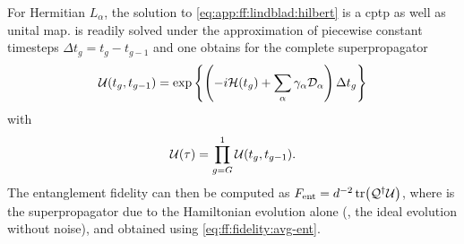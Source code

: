 For Hermitian $L_\alpha$, the solution to \cref{eq:app:ff:lindblad:hilbert} is a \gls{cptp} as well as unital map.
 is readily solved under the approximation of piecewise constant timesteps $\Delta t_g = t_{g} - t_{g-1}$ and one obtains for the complete superpropagator
\begin{equation}\label{eq:app:ff:lindblad:propagator}
    \mathcal{U}(t_{g}, t_{g-1}) = \exp\left\{ \left(-i\mathcal{H}(t_g) + \sum_\alpha\gamma_\alpha\mathcal{D}_\alpha\right) \Delta t_g \right\}
\end{equation}
with
\begin{equation}
    \mathcal{U}(\tau) = \prod_{g=G}^1\mathcal{U}(t_{g}, t_{g-1}).
\end{equation}
The entanglement fidelity can then be computed as $F_{\mathrm{ent}} = d^{-2}\tr(\mathcal{Q}^\dagger\mathcal{U})$, where \liouvQ is the superpropagator due to the Hamiltonian evolution alone (\ie, the ideal evolution without noise), and \avgfid obtained using \cref{eq:ff:fidelity:avg-ent}.

